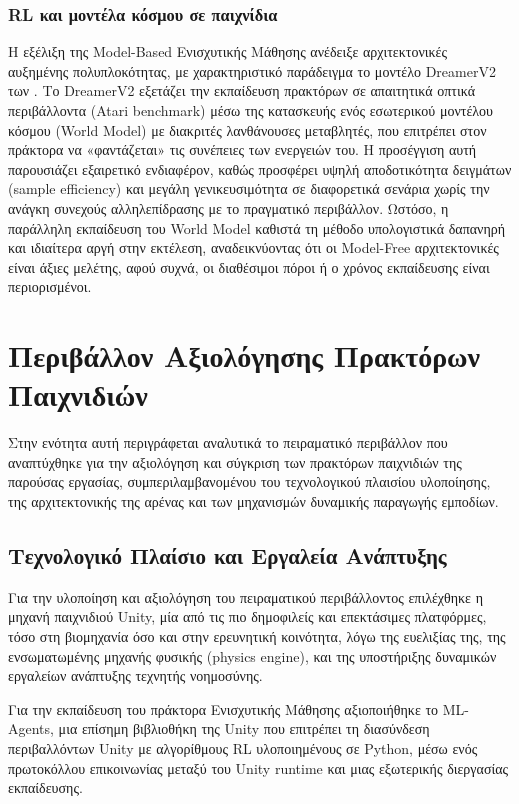 \documentclass[12pt]{article}
\begin{document}
\subsubsection{RL και μοντέλα κόσμου σε παιχνίδια}
Η εξέλιξη της Model-Based Ενισχυτικής Μάθησης ανέδειξε αρχιτεκτονικές αυξημένης πολυπλοκότητας, με χαρακτηριστικό παράδειγμα το μοντέλο DreamerV2 των \cite{hafner2021dreamerv2}. Το DreamerV2 εξετάζει την εκπαίδευση πρακτόρων σε απαιτητικά οπτικά περιβάλλοντα (Atari benchmark) μέσω της κατασκευής ενός εσωτερικού μοντέλου κόσμου (World Model) με διακριτές λανθάνουσες μεταβλητές, που επιτρέπει στον πράκτορα να «φαντάζεται» τις συνέπειες των ενεργειών του. Η προσέγγιση αυτή παρουσιάζει εξαιρετικό ενδιαφέρον, καθώς προσφέρει υψηλή αποδοτικότητα δειγμάτων (sample efficiency) και μεγάλη γενικευσιμότητα σε διαφορετικά σενάρια χωρίς την ανάγκη συνεχούς αλληλεπίδρασης με το πραγματικό περιβάλλον. Ωστόσο, η παράλληλη εκπαίδευση του World Model καθιστά τη μέθοδο υπολογιστικά δαπανηρή και ιδιαίτερα αργή στην εκτέλεση, αναδεικνύοντας ότι οι Model-Free αρχιτεκτονικές είναι άξιες μελέτης, αφού συχνά, οι διαθέσιμοι πόροι ή ο χρόνος εκπαίδευσης είναι περιορισμένοι.

\section{Περιβάλλον Αξιολόγησης Πρακτόρων Παιχνιδιών}

Στην ενότητα αυτή περιγράφεται αναλυτικά το πειραματικό περιβάλλον που αναπτύχθηκε για την αξιολόγηση και σύγκριση των πρακτόρων παιχνιδιών της παρούσας εργασίας, συμπεριλαμβανομένου του τεχνολογικού πλαισίου υλοποίησης, της αρχιτεκτονικής της αρένας και των μηχανισμών δυναμικής παραγωγής εμποδίων.

\subsection{Τεχνολογικό Πλαίσιο και Εργαλεία Ανάπτυξης}
Για την υλοποίηση και αξιολόγηση του πειραματικού περιβάλλοντος επιλέχθηκε η μηχανή παιχνιδιού Unity, μία από τις πιο δημοφιλείς και επεκτάσιμες πλατφόρμες, τόσο στη βιομηχανία όσο και στην ερευνητική κοινότητα, λόγω της ευελιξίας της, της ενσωματωμένης μηχανής φυσικής (physics engine), και της υποστήριξης δυναμικών εργαλείων ανάπτυξης τεχνητής νοημοσύνης.

Για την εκπαίδευση του πράκτορα Ενισχυτικής Μάθησης αξιοποιήθηκε το ML-Agents, μια επίσημη βιβλιοθήκη της Unity που επιτρέπει τη διασύνδεση περιβαλλόντων Unity με αλγορίθμους RL υλοποιημένους σε Python, μέσω ενός πρωτοκόλλου επικοινωνίας μεταξύ του Unity runtime και μιας εξωτερικής διεργασίας εκπαίδευσης.
\end{document}
